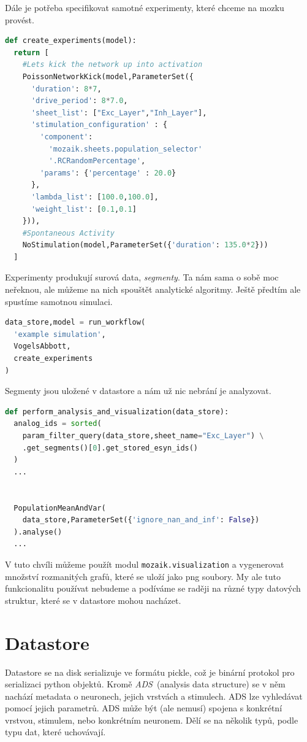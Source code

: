 Dále je potřeba specifikovat samotné experimenty, které chceme na mozku provést.

\begin{lstlisting}[language=Python]
def create_experiments(model):
  return [
    #Lets kick the network up into activation
    PoissonNetworkKick(model,ParameterSet({
      'duration': 8*7,
      'drive_period': 8*7.0,
      'sheet_list': ["Exc_Layer","Inh_Layer"],
      'stimulation_configuration' : {
        'component':
          'mozaik.sheets.population_selector'
          '.RCRandomPercentage',
        'params': {'percentage' : 20.0}
      },
      'lambda_list': [100.0,100.0],
      'weight_list': [0.1,0.1]
    })),
    #Spontaneous Activity 
    NoStimulation(model,ParameterSet({'duration': 135.0*2}))
  ]
\end{lstlisting}

Experimenty produkují surová data, \emph{segmenty}. Ta nám sama o sobě moc neřeknou, ale můžeme na nich spouštět analytické algoritmy. Ještě předtím ale spustíme samotnou simulaci.

\begin{lstlisting}[language=Python]
data_store,model = run_workflow(
  'example simulation',
  VogelsAbbott,
  create_experiments
)
\end{lstlisting}

Segmenty jsou uložené v datastore a nám už nic nebrání je analyzovat.

\begin{lstlisting}[language=Python]
def perform_analysis_and_visualization(data_store):
  analog_ids = sorted(
    param_filter_query(data_store,sheet_name="Exc_Layer") \
    .get_segments()[0].get_stored_esyn_ids()
  )
  ...

  
  PopulationMeanAndVar(
    data_store,ParameterSet({'ignore_nan_and_inf': False})
  ).analyse()
  ...
\end{lstlisting}

V tuto chvíli můžeme použít modul \lstinline|mozaik.visualization| a vygenerovat množství rozmanitých grafů, které se uloží jako png soubory. My ale tuto funkcionalitu používat nebudeme a podíváme se raději na různé typy datových struktur, které se v datastore mohou nacházet.

\section{Datastore}

Datastore se na disk serializuje ve formátu pickle, což je binární protokol pro serializaci python objektů. Kromě \emph{ADS}~(analysis data structure) se v něm nachází metadata o neuronech, jejich vrstvách a stimulech. ADS lze vyhledávat pomocí jejich parametrů. ADS může být (ale nemusí) spojena s konkrétní vrstvou, stimulem, nebo konkrétním neuronem. Dělí se na několik typů, podle typu dat, které uchovávají.

